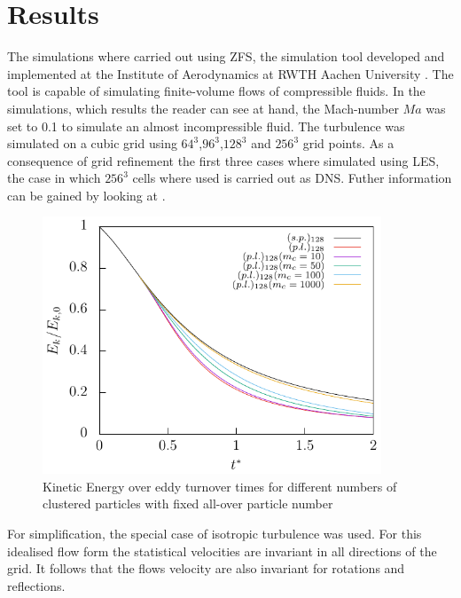 \documentclass[11pt,a4paper,openany,oneside,parskip=half*]{article}
\begin{document}
\section{Results}
The simulations where carried out using ZFS, the simulation tool developed and implemented at the Institute of Aerodynamics at RWTH Aachen University 
\cite{anAdaptiveMultilevelMultigridFormulationForCartesianHierarchicalGridMethods} \cite{aStrictlyConservativeCartesianCutCellMethodForCompressibleViscousFlowsOnAdaptiveGrids}. 
The tool is capable of simulating finite-volume flows of compressible fluids. In the simulations, which results the reader can see at hand, the Mach-number $Ma$ was set to 0.1 to simulate an almost incompressible fluid.
The turbulence was simulated on a cubic grid using $64^3$,$96^3$,$128^3$ and $256^3$ grid points. As a consequence of grid refinement the first three cases where simulated using LES, 
the case in which $256^3$ cells where used is carried out as DNS. Futher information can be gained by looking at \cite[p.344-357 for DNS and p. 558-639 for LES]{turbulentFlows}.
\begin{figure}[h]
	\centering
  \includegraphics[width=0.9\textwidth]{./../Simulationsergebnisse/variationWolken/128/kineticEnergy_time.pdf}
	\caption{Kinetic Energy over eddy turnover times for different numbers of clustered particles with fixed all-over particle number}
	\label{kineticEnergy_time_128}
\end{figure}
\newline
For simplification, the special case of isotropic turbulence was used. For this idealised flow form the statistical 
velocities are invariant in all directions of the grid. It follows that the flows velocity are also invariant for rotations and reflections. 
\end{document}
